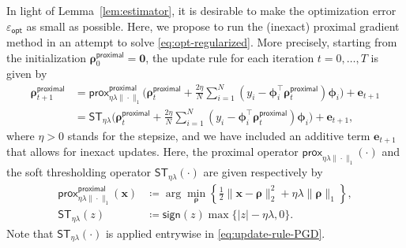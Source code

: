 \documentclass[english]{article}
\begin{document}
In light of Lemma~\ref{lem:estimator}, it is desirable to make the optimization error $\varepsilon_{\mathsf{opt}}$ as small as possible. Here, we propose to run the (inexact) proximal gradient method in an attempt to solve \eqref{eq:opt-regularized}. 
More precisely,  starting from the initialization ${\bm \rho}_0^{\mathsf{proximal}} = {\bm 0}$, the update rule for each iteration $t= 0,\dots, T$ is given by
%
\begin{subequations}
\begin{align}
{\bm \rho}_{t+1}^{\mathsf{proximal}} &= \mathsf{prox}^{\mathsf{proximal}}_{\eta\lambda\|\cdot\|_1}\Big({\bm \rho}_t^{\mathsf{proximal}} + \frac{2\eta}{N}\sum_{i = 1}^N (y_i - {\bm \phi}_i^{\top}{\bm \rho}_t^{\mathsf{proximal}}){\bm \phi}_i\Big) + {\bm e}_{t+1} \label{eq:update-rule-PGD-prox}\\
&= \mathsf{ST}_{\eta\lambda}\Big({\bm \rho}_t^{\mathsf{proximal}} + \frac{2\eta}{N}\sum_{i = 1}^N (y_i - {\bm \phi}_i^{\top}{\bm \rho}_t^{\mathsf{proximal}}){\bm \phi}_i\Big) + {\bm e}_{t+1},\label{eq:update-rule-PGD}
\end{align}
\end{subequations}
%
where $\eta>0$ stands for the stepsize, and we have included an additive term $\bm{e}_{t+1}$ that allows for inexact updates.  
Here, the proximal operator $\mathsf{prox}_{\eta\lambda\|\cdot\|_1}(\cdot)$ and the soft thresholding operator $\mathsf{ST}_{\eta\lambda}(\cdot)$ are given respectively by
%
\begin{subequations}
\begin{align}
\mathsf{prox}_{\eta\lambda\|\cdot\|_1}^{\mathsf{proximal}}({\bm x}) &\coloneqq \arg\min_{\bm \rho}\left\{\frac12\|{\bm x}-{\bm \rho}\|_2^2 + \eta\lambda\|{\bm \rho}\|_1 \right\}, \\
\mathsf{ST}_{\eta\lambda}(z) &\coloneqq \mathsf{sign}(z)\max\{|z|-\eta\lambda,0\}. 
\end{align}
\end{subequations}
%
Note that $\mathsf{ST}_{\eta\lambda}(\cdot)$ is applied entrywise in \eqref{eq:update-rule-PGD}.  
\end{document}
